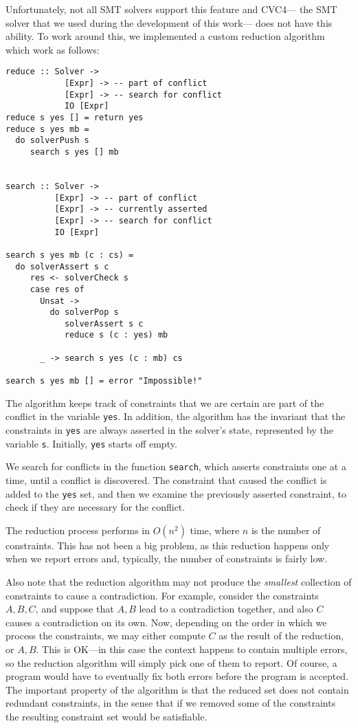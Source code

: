 \documentclass{sigplanconf}
\begin{document}
Unfortunately, not all SMT solvers support this feature and CVC4---%
the SMT solver that we used during the development of this work---%
does not have this ability.  To work around this, we implemented
a custom reduction algorithm which work as follows:
\begin{Verbatim}
reduce :: Solver ->
            [Expr] -> -- part of conflict
            [Expr] -> -- search for conflict
            IO [Expr]
reduce s yes [] = return yes
reduce s yes mb =
  do solverPush s
     search s yes [] mb


search :: Solver ->
          [Expr] -> -- part of conflict
          [Expr] -> -- currently asserted
          [Expr] -> -- search for conflict
          IO [Expr]

search s yes mb (c : cs) =
  do solverAssert s c
     res <- solverCheck s
     case res of
       Unsat ->
         do solverPop s
            solverAssert s c
            reduce s (c : yes) mb

       _ -> search s yes (c : mb) cs

search s yes mb [] = error "Impossible!"
\end{Verbatim}
The algorithm keeps track of constraints that we are certain are part
of the conflict in the variable \Verb"yes".  In addition, the algorithm
has the invariant that the constraints in \Verb"yes" are always asserted
in the solver's state, represented by the variable \Verb"s".
Initially, \Verb"yes" starts off empty.

We search for conflicts in the function \Verb"search", which asserts
constraints one at a time, until a conflict is discovered.  The constraint
that caused the conflict is added to the \Verb"yes" set, and then we
examine the previously asserted constraint, to check if they are necessary
for the conflict.

The reduction process performs in $O(n^2)$ time, where $n$ is the
number of constraints.  This has not been a big problem,
as this reduction happens only when we report errors and, typically,
the number of constraints is fairly low.

Also note that the reduction algorithm may not produce the {\em smallest}
collection of constraints to cause a contradiction.  For example, consider
the constraints $A,B,C$, and suppose that $A,B$ lead to a contradiction
together, and also $C$ causes a contradiction on its own.  Now, depending
on the order in which we process the constraints, we may either compute
$C$ as the result of the reduction, or $A,B$.  This is OK---in this
case the context happens to contain multiple errors, so the reduction
algorithm will simply pick one of them to report.  Of course, a program
would have to eventually fix both errors before the program is accepted.
The important property of the algorithm is that the reduced set does
not contain redundant constraints, in the sense that if we removed
some of the constraints the resulting constraint set would be satisfiable.
\end{document}
